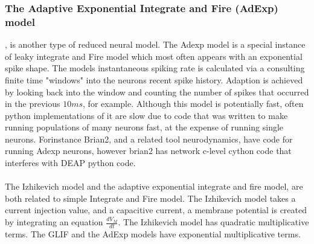 \subsubsection{The Adaptive Exponential Integrate and Fire (AdExp) model} \cite{brette2005adaptive}, is another type of reduced neural model. The Adexp model is a special instance of leaky integrate and Fire model which most often appears with an exponential spike shape. The models instantaneous spiking rate is calculated via a consulting finite time "windows" into the neurons recent spike history. Adaption is achieved by looking back into the window and counting the number of spikes that occurred in the previous $10ms$, for example. Although this model is potentially fast, often python implementations of it are slow due to code that was written to make running populations of many neurons fast, at the expense of running single neurons. Forinstance Brian2, and a related tool neurodynamics, have code for running Adexp neurons, however brian2 has network c-level cython code that interferes with DEAP python code.\\
\\
The Izhikevich model and the adaptive exponential integrate and fire model, are both related to simple Integrate and Fire model. The Izhikevich model takes a current injection value, and a capacitive current, a membrane potential is created by integrating an equation $\frac{d V_{M}}{dt}$. The Izhikevich model has quadratic multiplicative terms. The GLIF and the AdExp models have exponential multiplicative terms.



